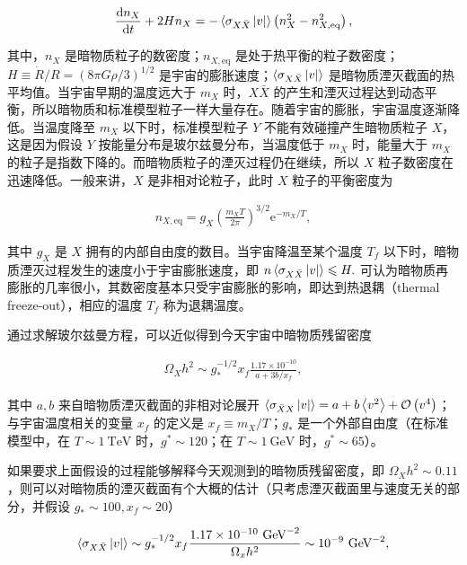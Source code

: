 \begin{align}
\frac{\mathrm{d}n_X }{\mathrm{d}t } + 2 H n_X 
=-\braket{\sigma_{X\bar{X}}\left|v \right|} \left(n_X^2 - n_{X,\mathrm{eq}}^2 \right),
\end{align}

其中，$n_X$ 是暗物质粒子的数密度；$n_{X,\mathrm{eq}}$ 是处于热平衡的粒子数密度；$H\equiv \dot{R}/R=\left(8\pi G \rho/3 \right)^{1/2}$ 是宇宙的膨胀速度；$\braket{\sigma_{X\bar{X}}\left|v \right|}$ 是暗物质湮灭截面的热平均值。当宇宙早期的温度远大于 $m_X$ 时，$X\bar{X}$ 的产生和湮灭过程达到动态平衡，所以暗物质和标准模型粒子一样大量存在。随着宇宙的膨胀，宇宙温度逐渐降低。当温度降至 $m_X$ 以下时，标准模型粒子 $Y$ 不能有效碰撞产生暗物质粒子 $X$，这是因为假设 $Y$ 按能量分布是玻尔兹曼分布，当温度低于 $m_X$ 时，能量大于 $m_X$ 的粒子是指数下降的。而暗物质粒子的湮灭过程仍在继续，所以 $X$ 粒子数密度在迅速降低。一般来讲，$X$ 是非相对论粒子，此时 $X$ 粒子的平衡密度为

\begin{align}
n_{X,\mathrm{eq}}
=g_X \left(\frac{m_X T}{2\pi }  \right)^{3/2} \mathrm{e}^{-m_X/T},
\end{align}

其中 $g_X$ 是 $X$ 拥有的内部自由度的数目。当宇宙降温至某个温度 $T_f$ 以下时，暗物质湮灭过程发生的速度小于宇宙膨胀速度，即 $n \Braket{\sigma_{X\bar{X}}\left|v \right|} \leqslant H .$ 可认为暗物质再膨胀的几率很小，其数密度基本只受宇宙膨胀的影响，即达到热退耦（thermal freeze-out），相应的温度 $T_f$ 称为退耦温度。

通过求解玻尔兹曼方程，可以近似得到今天宇宙中暗物质残留密度

\begin{align}
\Omega_X h^2 \sim g_*^{-1/2} x_f \frac{1.17\times 10^{-10} }{a+3b/x_f }, 
\end{align}

其中 $a,b$ 来自暗物质湮灭截面的非相对论展开 $\Braket{\sigma_{\bar{X}X}\left|v \right|}=a+b\Braket{v^2}+\mathcal{O}\left(v^4 \right)$；与宇宙温度相关的变量 $x_f$ 的定义是 $x_f\equiv m_X/T$；$g_*$ 是一个外部自由度（在标准模型中，在 $T\sim 1~\mathrm{TeV}$ 时，$g^*\sim 120$；在 $T\sim 1~\mathrm{GeV}$ 时，$g^*\sim 65$）。

如果要求上面假设的过程能够解释今天观测到的暗物质残留密度，即 $\Omega_X h^2 \sim 0.11$，则可以对暗物质的湮灭截面有个大概的估计（只考虑湮灭截面里与速度无关的部分，并假设 $g_*\sim 100,x_f\sim 20$）

\begin{align}
\Braket{\sigma_{X\bar{X}}\left|v \right|}
\sim g_*^{-1/2} x_f \frac{1.17 \times 10^{-10} ~\mathrm{GeV}^{-2} }{\Omega_x h^2 } \sim 10^{-9}~\mathrm{GeV}^{-2}, 
\end{align}


